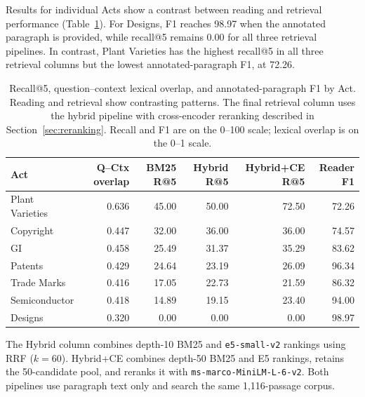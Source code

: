 \documentclass[pdflatex,sn-basic]{sn-jnl}%
\theoremstyle{thmstyleone}%
\theoremstyle{thmstyletwo}%
\theoremstyle{thmstylethree}%
\begin{document}
Results for individual Acts show a contrast between reading and retrieval
performance (Table~\ref{tab:retrieval_per_act}). For Designs, F1 reaches
98.97 when the annotated paragraph is provided, while recall@5 remains 0.00
for all three retrieval pipelines. In contrast, Plant Varieties has the
highest recall@5 in all three retrieval columns but the lowest
annotated-paragraph F1, at 72.26.

\begin{table}[!htbp]
    \caption{Recall@5, question--context lexical overlap, and
    annotated-paragraph F1 by Act. Reading and retrieval show contrasting
    patterns. The final retrieval column uses the hybrid pipeline with
    cross-encoder reranking described in Section~\ref{sec:reranking}.
    Recall and F1 are on the 0--100 scale; lexical overlap is on the
    0--1 scale.}
    \label{tab:retrieval_per_act}
    \centering
    \scriptsize
    \setlength{\tabcolsep}{3pt}
    \begin{tabular}{@{}lrrrrr@{}}
        \toprule
        Act & Q--Ctx overlap & BM25 R@5 & Hybrid R@5 &
        Hybrid+CE R@5 & Reader F1 \\
        \midrule
        Plant Varieties & 0.636 & 45.00 & 50.00 & 72.50 & 72.26 \\
        Copyright       & 0.447 & 32.00 & 36.00 & 36.00 & 74.57 \\
        GI              & 0.458 & 25.49 & 31.37 & 35.29 & 83.62 \\
        Patents         & 0.429 & 24.64 & 23.19 & 26.09 & 96.34 \\
        Trade Marks     & 0.416 & 17.05 & 22.73 & 21.59 & 86.32 \\
        Semiconductor   & 0.418 & 14.89 & 19.15 & 23.40 & 94.00 \\
        Designs         & 0.320 &  0.00 &  0.00 &  0.00 & 98.97 \\
        \bottomrule
    \end{tabular}
    \begin{flushleft}
        {\scriptsize The Hybrid column combines depth-10 BM25 and
        \texttt{e5-small-v2} rankings using RRF ($k=60$). Hybrid+CE combines
        depth-50 BM25 and E5 rankings, retains the 50-candidate pool, and
        reranks it with \texttt{ms-marco-MiniLM-L-6-v2}. Both pipelines use
        paragraph text only and search the same 1,116-passage corpus.}
    \end{flushleft}
\end{table}
\end{document}
